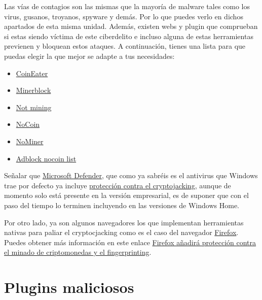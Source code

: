 \documentclass[
  spanish,
  a4paper,
  openany]{book}
\begin{document}
Las vías de contagios son las mismas que la mayoría de malware tales como los virus, gusanos, troyanos, spyware y demás. Por lo que puedes verlo en dichos apartados de esta misma unidad. Además, existen webs y plugin que comprueban si estas siendo víctima de este ciberdelito e incluso alguna de estas herramientas previenen y bloquean estos ataques. A continuación, tienes una lista para que puedas elegir la que mejor se adapte a tus necesidades:

\begin{itemize}
\item
  \href{https://github.com/fhstp/CoinEater}{CoinEater}
\item
  \href{https://github.com/xd4rker/MinerBlock}{Minerblock}
\item
  \href{https://notmining.es}{Not mining}
\item
  \href{https://github.com/keraf/NoCoin}{NoCoin}
\item
  \href{https://chrome.google.com/webstore/detail/nominer-block-coin-miners/jfnangjojcioomickmmnfmiadkfhcdmd}{NoMiner}
\item
  \href{https://github.com/hoshsadiq/adblock-nocoin-list}{Adblock nocoin list}
\end{itemize}

Señalar que \href{https://www.microsoft.com/es-es/windows/comprehensive-security}{Microsoft Defender}, que como ya sabréis es el antivirus que Windows trae por defecto ya incluye \href{https://www.microsoft.com/security/blog/2021/04/26/defending-against-cryptojacking-with-microsoft-defender-for-endpoint-and-intel-tdt/}{protección contra el cryptojacking}, aunque de momento solo está presente en la versión empresarial, es de suponer que con el paso del tiempo lo terminen incluyendo en las versiones de Windows Home.

Por otro lado, ya son algunos navegadores los que implementan herramientas nativas para paliar el cryptocjacking como es el caso del navegador \href{https://www.mozilla.org/es-ES/firefox/browsers/}{Firefox}. Puedes obtener más información en este enlace \href{https://www.genbeta.com/navegadores/firefox-anadira-proteccion-minado-criptomonedas-fingerprinting}{Firefox añadirá protección contra el minado de criptomonedas y el fingerprinting}.

\hypertarget{plugins-maliciosos}{%
\section{Plugins maliciosos}\label{plugins-maliciosos}}
\end{document}
